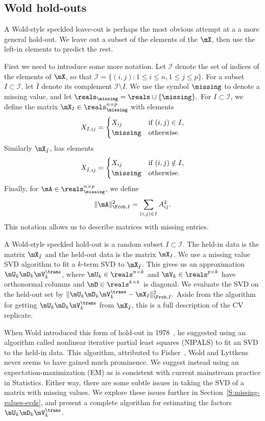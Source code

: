 \subsection{Wold hold-outs}

A Wold-style speckled leave-out is perhaps the most obvious attempt at a a
more general hold-out. We leave out a subset of the elements of the $\mX$, then
use the left-in elements to predict the rest.

First we need to introduce some more notation. Let $\mathcal{I}$ denote the
set of indices of the elements of $\mX$, so that $\mathcal{I} = \{ (i,j) : 1
\leq i \leq n, 1 \leq j \leq p \}$. For a subset $I \subset \mathcal{I}$, let
$\bar I$ denote its complement $\mathcal{I} \setminus I$. We use the symbol
$\missing$ to denote a missing value, and let 
\(
    \reals_\missing = \reals \cup \{ \missing \}.
\)
For $I \subset \mathcal{I}$, we define the matrix $\mX_I \in
\reals_\missing^{n \times p}$ with elements
\[
    X_{I,ij}
    =
    \begin{cases}
        X_{ij}     &\text{if $(i,j) \in I$,} \\
        \missing   &\text{otherwise.}
    \end{cases}
\]
Similarly $\mX_{\bar I}$, has elements
\[
    X_{\bar I,ij}
    =
    \begin{cases}
        X_{ij}     &\text{if $(i,j) \notin I$,} \\
        \missing   &\text{otherwise.}
    \end{cases}
\]
Finally, for $\mA \in \reals_\missing^{n \times p}$, we define
\[
    \| \mA \|_{\Frob,I}^2
        =
        \sum_{(i,j) \in I} A_{ij}^2.
\]
This notation allows us to describe matrices with missing entries.

A Wold-style speckled hold-out is a random subset $I \subset \mathcal{I}$.  The 
held-in data is the matrix $\mX_{\bar I}$ and the held-out data is the matrix 
$\mX_I$.  We use a missing value SVD algorithm to fit a $k$-term SVD to 
$\mX_{\bar I}$.  This gives us an approximation $\mU_k \mD_k \mV_k^\trans$, 
where $\mU_k \in \reals^{n \times k}$ and $\mV_k \in \reals^{p \times k}$ have 
orthonormal columns and $\mD \in \reals^{k \times k}$ is diagonal.  We 
evaluate the SVD on the held-out set by 
\(
    \| \mU_k \mD_k \mV_k^\trans - \mX_I \|_{\Frob,I}^2.
\)
Aside from the algorithm for getting $\mU_k \mD_k \mV_k^\trans$ from 
$\mX_{\bar I}$, this is a full description of the CV replicate.

When Wold introduced this form of hold-out in 1978~\cite{wold1978cross}, he
suggested using an algorithm called nonlinear iterative partial least squares
(NIPALS) to fit an SVD to the held-in data. This algorithm, attributed to
Fisher~\cite{fisher1923scv}, Wold and Lyttkens~\cite{wold1969nonlinear} never
seems to have gained much prominence. We suggest instead using an
expectation-maximization (EM) as is consistent with current mainstream
practice in Statistics. Either way, there are some subtle issues in taking the
SVD of a matrix with missing values. We explore these issues further in
Section~\ref{S:missing-values-svds}, and present a complete algorithm for
estimating the factors $\mU_k \mD_k \mV_k^\trans$.

